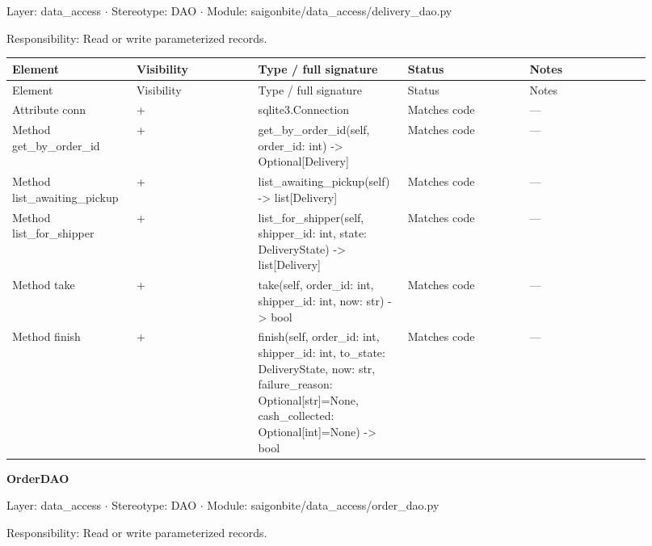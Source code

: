 Layer: data\_access \ensuremath{\cdot} Stereotype: \guillemotleft{}DAO\guillemotright{} \ensuremath{\cdot} Module: saigonbite/data\_access/delivery\_dao.py

Responsibility: Read or write parameterized records.

\begin{longtable}{>{\raggedright\arraybackslash}p{0.1840\linewidth}>{\raggedright\arraybackslash}p{0.1840\linewidth}>{\raggedright\arraybackslash}p{0.1840\linewidth}>{\raggedright\arraybackslash}p{0.1840\linewidth}>{\raggedright\arraybackslash}p{0.1840\linewidth}}
Element & Visibility & Type / full signature & Status & Notes \\
\hline\endfirsthead
Element & Visibility & Type / full signature & Status & Notes \\
\hline\endhead
Attribute conn & + & sqlite3.Connection & Matches code & --- \\
Method get\_by\_order\_id & + & get\_by\_order\_id(self, order\_id: int) -\textgreater{} Optional[Delivery] & Matches code & --- \\
Method list\_awaiting\_pickup & + & list\_awaiting\_pickup(self) -\textgreater{} list[Delivery] & Matches code & --- \\
Method list\_for\_shipper & + & list\_for\_shipper(self, shipper\_id: int, state: DeliveryState) -\textgreater{} list[Delivery] & Matches code & --- \\
Method take & + & take(self, order\_id: int, shipper\_id: int, now: str) -\textgreater{} bool & Matches code & --- \\
Method finish & + & finish(self, order\_id: int, shipper\_id: int, to\_state: DeliveryState, now: str, failure\_reason: Optional[str]=None, cash\_collected: Optional[int]=None) -\textgreater{} bool & Matches code & --- \\
\end{longtable}
\textbf{OrderDAO}

Layer: data\_access \ensuremath{\cdot} Stereotype: \guillemotleft{}DAO\guillemotright{} \ensuremath{\cdot} Module: saigonbite/data\_access/order\_dao.py

Responsibility: Read or write parameterized records.

